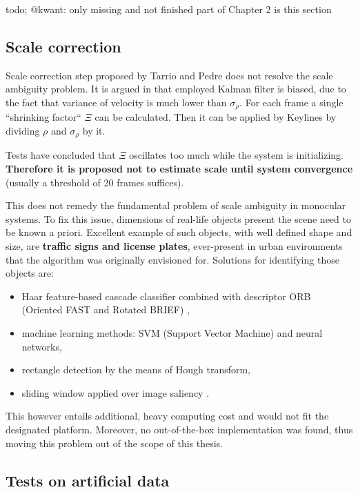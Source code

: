  todo; @kwant: only missing and not finished part of Chapter 2 is this section


\subsection{Scale correction}

Scale correction step proposed by Tarrio and Pedre does not resolve the scale ambiguity problem. It is argued in \cite{jose2015realtime} that employed Kalman filter is biased, due to the fact that variance of velocity is much lower than $\sigma_{\rho}$. For each frame a single ``shrinking factor`` $\Xi$ can be calculated. Then it can be applied by Keylines by dividing $\rho$ and $\sigma_{\rho}$ by it.

Tests have concluded that $\Xi$ oscillates too much while the system is initializing. \textbf{Therefore it is proposed not to estimate scale until system convergence} (usually a threshold of 20 frames suffices).

This does not remedy the fundamental problem of scale ambiguity in monocular systems. To fix this issue, dimensions of real-life objects present the scene need to be known a priori. Excellent example of such objects, with well defined shape and size, are \textbf{traffic signs and license plates}, ever-present in urban environments that the algorithm was originally envisioned for. Solutions for identifying those objects are:
\begin{itemize}
	\item Haar feature-based cascade classifier combined with descriptor ORB (Oriented FAST and Rotated BRIEF) \cite{opencv},
	\item machine learning methods: SVM (Support Vector Machine) and neural networks,
	\item rectangle detection by the means of Hough transform,
	\item sliding window applied over image saliency \cite{lin2010robust}.
\end{itemize}

This however entails additional, heavy computing cost and would not fit the designated platform. Moreover, no out-of-the-box implementation was found, thus moving this problem out of the scope of this thesis.


\subsection{Tests on artificial data}

